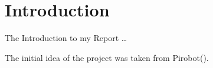 \chapter{Introduction} \label{Chapter:Introduction}
The Introduction to my Report \dots

The initial idea of the project was taken from Pirobot(\cite{Pirobot}).

